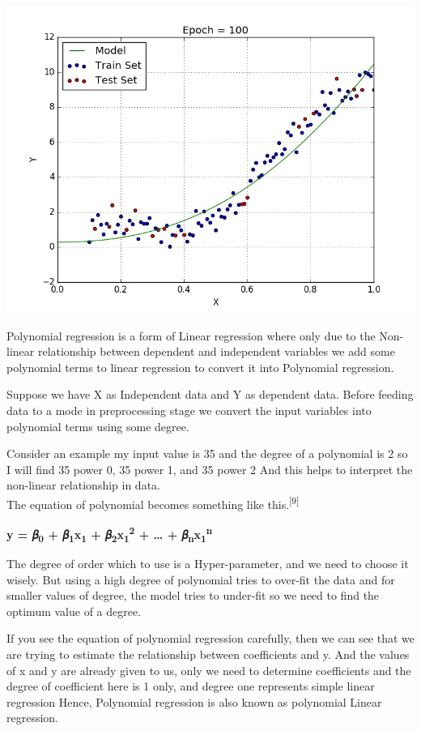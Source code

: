 \documentclass[
  letterpaper,
  DIV=11,
  numbers=noendperiod]{scrreport}
\begin{document}
\includegraphics{./images/PolyRegressionConversion.gif}

Polynomial regression is a form of Linear regression where only due to
the Non-linear relationship between dependent and independent variables
we add some polynomial terms to linear regression to convert it into
Polynomial regression.

Suppose we have X as Independent data and Y as dependent data. Before
feeding data to a mode in preprocessing stage we convert the input
variables into polynomial terms using some degree.

Consider an example my input value is 35 and the degree of a polynomial
is 2 so I will find 35 power 0, 35 power 1, and 35 power 2 And this
helps to interpret the non-linear relationship in data.\\
The equation of polynomial becomes something like
this.\textsuperscript{{[}9{]}}

\textbf{y = 𝛽\textsubscript{0} + 𝛽\textsubscript{1}x\textsubscript{1} +
𝛽\textsubscript{2}x\textsubscript{1}\textsuperscript{2} + \ldots{} +
𝛽\textsubscript{n}x\textsubscript{1}\textsuperscript{n}}

The degree of order which to use is a Hyper-parameter, and we need to
choose it wisely. But using a high degree of polynomial tries to
over-fit the data and for smaller values of degree, the model tries to
under-fit so we need to find the optimum value of a degree.

If you see the equation of polynomial regression carefully, then we can
see that we are trying to estimate the relationship between coefficients
and y. And the values of x and y are already given to us, only we need
to determine coefficients and the degree of coefficient here is 1 only,
and degree one represents simple linear regression Hence, Polynomial
regression is also known as polynomial Linear regression.
\end{document}
